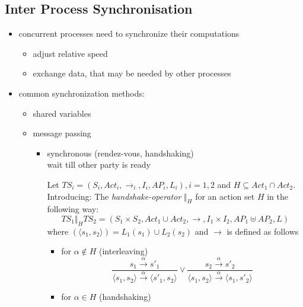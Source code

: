 \documentclass[a4paper, 10pt]{article}
\begin{document}
\subsection*{Inter Process Synchronisation}
\begin{itemize}
    \item concurrent processes need to synchronize their computations
    \begin{itemize}
        \item adjust relative speed
        \item exchange data, that may be needed by other processes
    \end{itemize}
    \item common synchronization methods:
    \begin{itemize}
        \item shared variables
        \item message passing
        \begin{itemize}
            \item synchronous (rendez-vous, handshaking) \\
            wait till other party is ready
            \begin{shaded}
                Let $TS_i=(S_i,Act_i,\longrightarrow_i,I_i,AP_i,L_i), i=1,2$ and $H\subseteq Act_1\cap Act_2$. \\
                Introducing: The \emph{handshake-operator} $\Vert_H$ for an action set $H$ in the following way:
                \[ TS_1 \Vert_H TS_2 = (S_1\times S_2,Act_1\cup Act_2,\longrightarrow,I_1\times I_2, AP_1 \uplus AP_2,L) \]
                where $(\langle s_1,s_2\rangle) = L_1(s_1)\cup L_2(s_2)$ and $\longrightarrow$ is defined as follows
                \begin{itemize}
                    \item for $\alpha\not\in H$ (interleaving)
                    \[
                    \frac{
                    s_1 \overset{\alpha}{\longrightarrow} s'_1
                    }{
                    \langle s_1,s_2 \rangle \overset{\alpha}{\longrightarrow} \langle s'_1,s_2 \rangle
                    }
                    \vee
                    \frac{
                    s_2 \overset{\alpha}{\longrightarrow} s'_2
                    }{
                    \langle s_1,s_2 \rangle \overset{\alpha}{\longrightarrow} \langle s_1,s'_2 \rangle
                    }
                    \]
                    \item for $\alpha\in H$ (handshaking)

\end{itemize}
\end{shaded}
\end{itemize}
\end{itemize}
\end{itemize}
\end{document}
